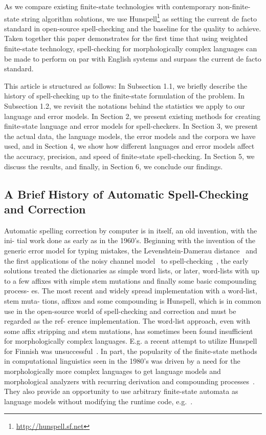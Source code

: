 \documentclass[postprint]{flammie}
\begin{document}
As we compare existing finite-state technologies with contemporary
non-finite-state string algorithm solutions, we use
Hunspell\footnote{\url{http://hunspell.sf.net}} as setting the current de facto
standard in open-source spell-checking and the baseline for the quality to
achieve.  Taken together this paper demonstrates for the first time that using
weighted finite-state technology, spell-checking for morphologically complex
languages can be made to perform on par with English systems and surpass the
current de facto standard.

This article is structured as follows: In Subsection 1.1, we briefly describe
the history of spell-checking up to the finite-state formulation of the
problem. In Subsection 1.2, we revisit the notations behind the statistics we
apply to our language and error models. In Section 2, we present existing
methods for creating finite-state language and error models for spell-checkers.
In Section 3, we present the actual data, the language models, the error
models and the corpora we have used, and in Section 4, we show how different
languages and error models affect the accuracy, precision, and speed of
finite-state spell-checking. In Section 5, we discuss the results, and finally,
in Section 6, we conclude our findings.

\subsection{A Brief History of Automatic Spell-Checking and Correction}

Automatic spelling correction by computer is in itself, an old invention, with
the ini- tial work done as early as in the 1960’s. Beginning with the invention
of the generic error model for typing mistakes, the Levenshtein-Damerau
distance~\cite{damerau1964technique,levenshtein1965binary} and the first
applications of the noisy channel model~\cite{shannon1948mathematical} to
spell-checking~\cite{raviv1967decision}, the early solutions treated the
dictionaries as simple word lists, or later, word-lists with up to a few
affixes with simple stem mutations and finally some basic compounding process-
es. The most recent and widely spread implementation with a word-list, stem
muta- tions, affixes and some compounding is Hunspell, which is in common use
in the open-source world of spell-checking and correction and must be regarded
as the ref- erence implementation. The word-list approach, even with some affix
stripping and stem mutations, has sometimes been found insufficient for
morphologically complex languages. E.g. a recent attempt to utilize Hunspell
for Finnish was unsuccessful~\cite{pitkanen2006hunspell}. In part, the
popularity of the finite-state methods in computational linguistics seen in the
1980’s was driven by a need for the morphologically more complex languages to
get language models and morphological analyzers with recurring derivation and
compounding processes~\cite{beesley2004morphological}. They also provide an
opportunity to use arbitrary finite-state automata as language models without
modifying the runtime code, e.g.~\cite{pirinen2010finite}.
\end{document}
